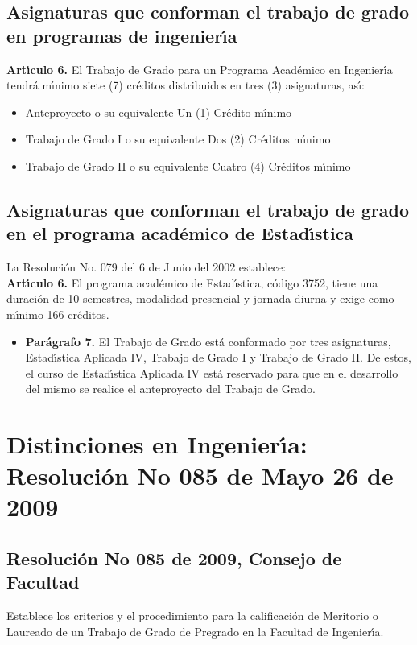 \subsection{Asignaturas que conforman el trabajo de grado en programas de
ingenier\'{\i}a}

\textbf{Art\'{\i}culo 6.} El Trabajo de Grado para un Programa Acad\'{e}mico en
Ingenier\'{\i}a tendr\'{a} m\'{\i}nimo siete (7) cr\'{e}ditos distribuidos en tres (3)
asignaturas, as\'{\i}:
\begin{itemize}
\item Anteproyecto o su equivalente Un (1) Cr\'{e}dito m\'{\i}nimo
\item Trabajo de Grado I o su equivalente Dos (2) Cr\'{e}ditos m\'{\i}nimo
\item Trabajo de Grado II o su equivalente Cuatro (4) Cr\'{e}ditos m\'{\i}nimo
\end{itemize}

\subsection{Asignaturas que conforman el trabajo de grado en el programa
acad\'{e}mico de Estad\'{\i}stica}

La Resoluci\'{o}n No. 079 del 6 de Junio del 2002 establece:\\

\textbf{Art\'{\i}culo 6.} El programa acad\'{e}mico de Estad\'{\i}stica, c\'{o}digo 3752, tiene
una duraci\'{o}n de 10 semestres, modalidad presencial y jornada diurna
y exige como m\'{\i}nimo 166 cr\'{e}ditos.
\begin{itemize}
\item\textbf{ Par\'{a}grafo 7.} El Trabajo de Grado est\'{a} conformado por tres
asignaturas, Estad\'{\i}stica Aplicada IV, Trabajo de Grado I y Trabajo
de Grado II. De estos, el curso de Estad\'{\i}stica Aplicada IV est\'{a}
reservado para que en el desarrollo del mismo se realice el
anteproyecto del Trabajo de Grado.
\end{itemize}

\section{Distinciones en Ingenier\'{\i}a: Resoluci\'{o}n No 085 de Mayo 26 de 2009}

\subsection{Resoluci\'{o}n No 085 de 2009, Consejo de Facultad}
Establece los criterios y el procedimiento para la calificaci\'{o}n de
Meritorio o Laureado de un Trabajo de Grado de Pregrado en la
Facultad de Ingenier\'{\i}a.

